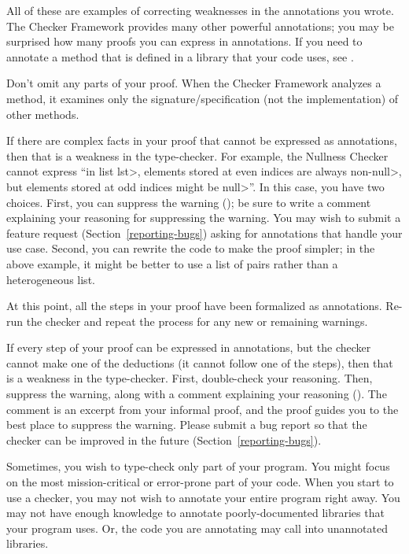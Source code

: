 All of these are examples of correcting weaknesses in the annotations you wrote.
The Checker Framework provides many other powerful annotations; you may
be surprised how many proofs you can express in annotations.
If you need to annotate a method that is defined in a
library that your code uses, see .

Don't omit any parts of your proof.  When the Checker Framework analyzes
a method, it examines only the signature/specification (not the implementation)
of other methods.

If there are complex facts in your proof that cannot be expressed as
annotations, then that is a weakness in the type-checker.  For example,
the Nullness Checker cannot express ``in list \<lst>, elements stored at
even indices are always non-\<null>, but elements stored at odd indices
might be \<null>''.  In this case, you have two choices.
%
First, you can suppress the warning
(); be sure to write a comment
explaining your reasoning for suppressing the warning.  You may wish to
submit a feature request (Section~\ref{reporting-bugs}) asking for
annotations that handle your use case.
%
Second, you can rewrite the code to make the proof simpler;
in the above example, it might be better to use a list of pairs
rather than a heterogeneous list.

At this point, all the steps in your proof have been formalized as
annotations.  Re-run the checker and repeat the process for any new or
remaining warnings.

If every step of your proof can be expressed in annotations, but the
checker cannot make one of the deductions (it cannot follow one of the
steps), then that is a weakness in the type-checker.  First, double-check
your reasoning.  Then, suppress the warning, along with a comment
explaining your reasoning ().
The comment is an excerpt from your informal proof, and the proof guides
you to the best place to suppress the warning.
Please submit a bug report so that the checker can be improved
in the future (Section~\ref{reporting-bugs}).





Sometimes, you wish to type-check only part of your program.
You might focus on the most mission-critical or error-prone part of your
code.  When you start to use a checker, you may not wish to annotate
your entire program right away.
You may not have
enough knowledge to annotate poorly-documented libraries that your program uses.
Or, the code you are annotating may call into unannotated libraries.

